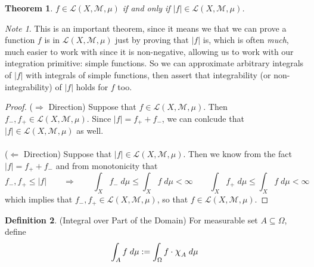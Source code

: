 \documentclass[12pt]{article}
\theoremstyle{plain}
\newtheorem{thm}{Theorem}[section]
\theoremstyle{definition}
\newtheorem{defn}[thm]{Definition}
\theoremstyle{remark}
\newtheorem*{note}{Note}
\newcommand*{\Chi}{\mbox{\large$\chi$}} %
\begin{document}
\begin{thm}
$f\in\mathscr{L}(X,\mathscr{M},\mu)$ if and only if $|f|\in\mathscr{L}(X,\mathscr{M},\mu)$.
\end{thm}
\begin{note}
This is an important theorem, since it means we that we can prove a function $f$ is in $\mathscr{L}(X,\mathscr{M},\mu)$ just by proving that $|f|$ is, which is often \emph{much}, much easier to work with since it is non-negative, allowing us to work with our integration primitive: simple functions. So we can approximate arbitrary integrals of $|f|$ with integrals of simple functions, then assert that integrability (or non-integrability) of $|f|$ holds for $f$ too.
\end{note}
\begin{proof}
($\Rightarrow$ Direction) Suppose that $f\in\mathscr{L}(X,\mathscr{M},\mu)$. Then $f_-, f_+\in\mathscr{L}(X,\mathscr{M},\mu)$. Since $|f|=f_+ + f_-$, we can conlcude that $|f|\in\mathscr{L}(X,\mathscr{M},\mu)$ as well.
\\
\\
($\Leftarrow$ Direction) Suppose that $|f|\in\mathscr{L}(X,\mathscr{M},\mu)$. Then we know from the fact $|f|=f_+ + f_-$ and from monotonicity that
\[
    f_-, f_+ \leq |f| \qquad \Rightarrow
    \qquad
    \int_X f_- \; d\mu \leq \int_X f \; d\mu <\infty\qquad
    \int_X f_+ \; d\mu \leq \int_X f \; d\mu <\infty
\]
which implies that $f_-, f_+\in\mathscr{L}(X,\mathscr{M},\mu)$, so that $f\in\mathscr{L}(X,\mathscr{M},\mu)$.
\end{proof}

\begin{defn}(Integral over Part of the Domain)
For measurable set $A\subseteq \Omega$, define
\begin{align*}
  \int_{A} f\; d\mu
  :=
  \int_{\Omega} f\cdot\Chi_A\; d\mu
\end{align*}
\end{defn}
\end{document}
